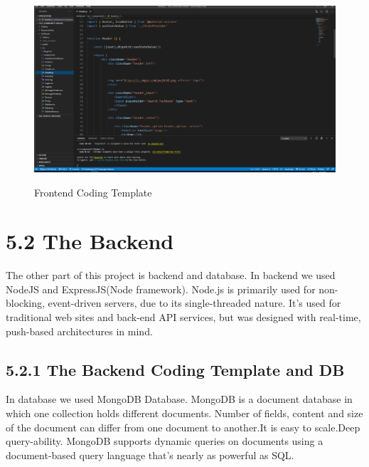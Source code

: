 \documentclass{standalone}
\begin{document}
\begin{figure}
\includegraphics[scale=0.3]{./img/img3.png}\\[2cm]
\caption{Frontend Coding Template}
\label{fig:Frontend}
\end{figure}

\clearpage
\vfill


\section*{5.2\hspace{0.3 cm} The Backend}
 \vspace{0.3cm}

\hspace{0.5cm} The other part of this project is backend and database. In backend we used NodeJS and ExpressJS(Node framework).
Node.js is primarily used for non-blocking, event-driven servers, due to its single-threaded nature. It's used for traditional web sites and back-end API services, but was designed with real-time, push-based architectures in mind.\\[0.8cm]


\subsection*{5.2.1\hspace{0.3 cm} The Backend Coding Template and DB}
 \vspace{0.8cm}

\hspace{0.5cm} In database we used MongoDB Database. MongoDB is a document database in which one collection holds different documents. Number of fields, content and size of the document can differ from one document to another.It is easy to scale.Deep query-ability. MongoDB supports dynamic queries on documents using a document-based query language that's nearly as powerful as SQL.\\[0.8cm]
\end{document}
